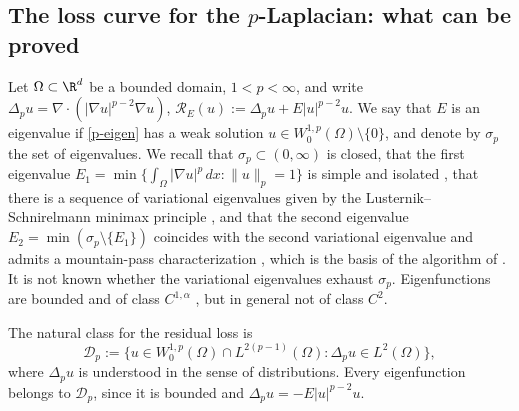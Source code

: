 
\subsection*{The loss curve for the $p$-Laplacian: what can be proved}

Let $\Omega\subset\R^d$ be a bounded domain, $1<p<\infty$, and write
$\Delta_pu=\nabla\cdot(|\nabla u|^{p-2}\nabla u)$,
$\mathcal R_E(u):=\Delta_pu+E|u|^{p-2}u$. We say that $E$ is an eigenvalue if
\eqref{p-eigen} has a weak solution $u\in W^{1,p}_0(\Omega)\setminus\{0\}$, and denote by
$\sigma_p$ the set of eigenvalues. We recall that $\sigma_p\subset(0,\infty)$ is closed,
that the first eigenvalue
$E_1=\min\{\int_\Omega|\nabla u|^p\,dx\colon \|u\|_p=1\}$ is simple and isolated
\cite{Anane1987,Lindqvist1990}, that there is a sequence of variational eigenvalues given
by the Lusternik--Schnirelmann minimax principle \cite{GarciaAzorero-Peral}, and that the
second eigenvalue $E_2=\min(\sigma_p\setminus\{E_1\})$ coincides with the second
variational eigenvalue \cite{Anane-Tsouli} and admits a mountain-pass characterization
\cite{Cuesta-deFigueiredo-Gossez}, which is the basis of the algorithm of \cite{HJ11}.
It is not known whether the variational eigenvalues exhaust $\sigma_p$. Eigenfunctions
are bounded and of class $C^{1,\alpha}$ \cite{DiBenedetto,Tolksdorf}, but in general not
of class $C^2$.

The natural class for the residual loss is
\[
\mathcal D_p:=\big\{u\in W^{1,p}_0(\Omega)\cap L^{2(p-1)}(\Omega)\colon
\Delta_pu\in L^2(\Omega)\big\},
\]
where $\Delta_pu$ is understood in the sense of distributions. Every eigenfunction belongs
to $\mathcal D_p$, since it is bounded and $\Delta_pu=-E|u|^{p-2}u$.

